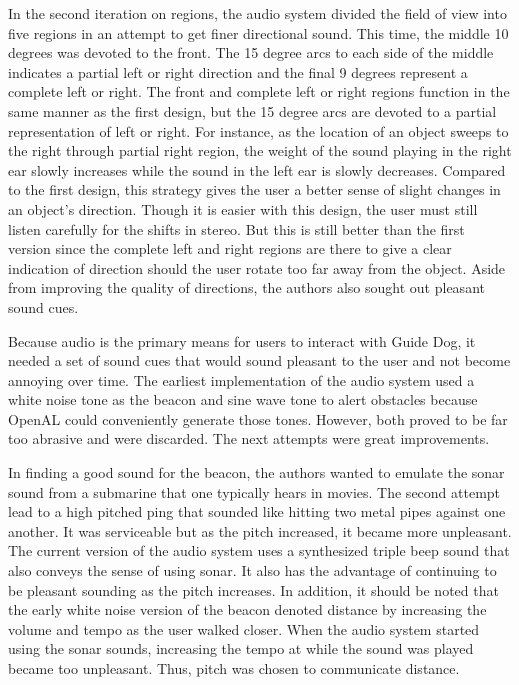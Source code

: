 In the second iteration on regions, the audio system divided the field of view
into five regions in an attempt to get finer directional sound. This time, the
middle 10 degrees was devoted to the front. The 15 degree arcs to each side of
the middle indicates a partial left or right direction and the final 9 degrees 
represent a complete left or right. The front and complete left or right regions 
function in the same manner as the first design, but the 15 degree arcs are 
devoted to a partial representation of left or right. For instance, as the
location of an object sweeps to the right through partial right region, the 
weight of the sound playing in the right ear slowly increases while the sound in
the left ear is slowly decreases. Compared to the first design, this strategy 
gives the user a better sense of slight changes in an object's direction. Though
it is easier with this design, the user must still listen carefully for the
shifts in stereo. But this is still better than the first version since the
complete left and right regions are there to give a clear indication of direction
should the user rotate too far away from the object. Aside from improving the
quality of directions, the authors also sought out pleasant sound cues.

Because audio is the primary means for users to interact with Guide Dog, it
needed a set of sound cues that would sound pleasant to the user and not become
annoying over time. The earliest implementation of the audio system used a
white noise tone as the beacon and sine wave tone to alert obstacles because
OpenAL could conveniently generate those tones. However, both proved to be far 
too abrasive and were discarded. The next attempts were great improvements.

In finding a good sound for the beacon, the authors wanted to emulate the sonar
sound from a submarine that one typically hears in movies. The second attempt
lead to a high pitched ping that sounded like hitting two metal pipes against
one another. It was serviceable but as the pitch increased, it became more
unpleasant. The current version of the audio system uses a synthesized triple
beep sound that also conveys the sense of using sonar. It also has the
advantage of continuing to be pleasant sounding as the pitch increases. In
addition, it should be noted that the early white noise version of the beacon
denoted distance by increasing the volume and tempo as the user walked closer.
When the audio system started using the sonar sounds, increasing the tempo at
while the sound was played became too unpleasant. Thus, pitch was chosen to
communicate distance.

